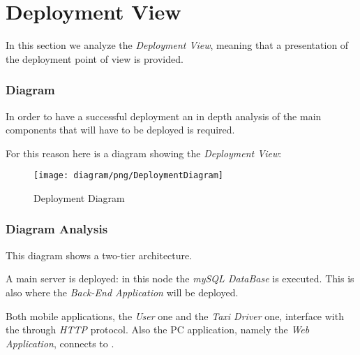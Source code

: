\newpage

\section{Deployment View} %
\label{sec:deployment_view}

In this section we analyze the \emph{Deployment View}, meaning that a presentation of the deployment point of view is provided.

\subsubsection{Diagram} %
\label{ssub:diagram}

In order to have a successful deployment an in depth analysis of the main components that will have to be deployed is required.

For this reason here is a diagram showing the \emph{Deployment View}:

\begin{figure}[h!t]
\caption{Deployment Diagram}
\texttt{[image: diagram/png/DeploymentDiagram]}
\centering
\end{figure}
\newpage


\subsubsection{Diagram Analysis} %
\label{ssub:diagram_analysis}

This diagram shows a two-tier architecture.

A main server is deployed: in this node the \emph{mySQL DataBase} is executed. This is also where the \emph{Back-End Application} will be deployed.

Both mobile applications, the \emph{User} one and the \emph{Taxi Driver} one, interface with the \emph{} through \emph{HTTP} protocol.
Also the PC application, namely the \emph{Web Application}, connects to \emph{}.
